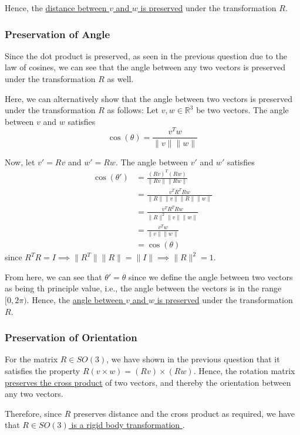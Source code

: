 Hence, the \underline{distance between \(v\) and \(w\) is preserved} under the transformation \(R\).

\subsubsection*{Preservation of Angle}

Since the dot product is preserved, as seen in the previous question due to the law of cosines, we can see that the angle between any two vectors is preserved under the transformation \( R \) as well.

Here, we can alternatively show that the angle between two vectors is preserved under the transformation \( R \) as follows:
Let \(v, w \in \mathbb{R}^{3}\) be two vectors. The angle between \(v\) and \(w\) satisfies
\[
    \cos(\theta) = \frac{v^{T} w}{\lVert v \rVert \lVert w \rVert}
\]

Now, let \(v' = R v\) and \(w' = R w\). The angle between \(v'\) and \(w'\) satisfies
\begin{align*}
    \cos(\theta')
     & = \frac{{(R v)}^{T} (R w)}{\lVert R v \rVert \lVert R w \rVert}
    \\ & = \frac{v^{T} R^{T} R w}{\lVert R \rVert \lVert v \rVert \lVert R \rVert \lVert w \rVert}
    \\ & = \frac{v^{T} R^{T} R w}{\lVert R \rVert ^ 2 \lVert v \rVert \lVert w \rVert}
    \\ & = \frac{v^{T} w}{\lVert v \rVert \lVert w \rVert}
    \\ & = \cos(\theta)
\end{align*}
since \(R^{T} R = I \implies \lVert R^T \rVert \lVert R \rVert = \lVert I \rVert \implies \lVert R \rVert ^2 = 1\).

From here, we can see that \( \theta' = \theta \) since we define the angle between two vectors as being th principle value, i.e., the angle between the vectors is in the range \([0, 2\pi)\).
Hence, the \underline{angle between \(v\) and \(w\) is preserved} under the transformation \(R\).

\subsubsection*{Preservation of Orientation}

For the matrix \( R \in S O(3) \), we have shown in the previous question that it satisfies the property \( R(v \times w) = (R v) \times (R w) \).
Hence, the rotation matrix \underline{preserves the cross product} of two vectors, and thereby the orientation between any two vectors.

Therefore, since \( R \) preserves distance and the cross product as required, we have that \underline{ \(R \in S O(3)\) is a rigid body transformation }.
